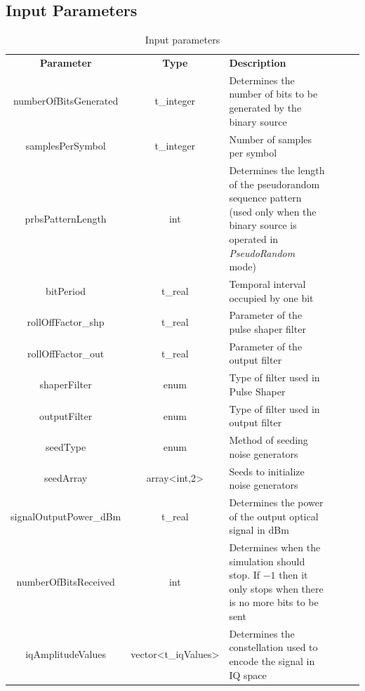 \subsection*{Input Parameters}


\begin{table}[H]
	\centering
	\caption{Input parameters}
	\begin{tabular}{|c|c|p{70mm}|ccp{70mm}}
		\cline{1-3}
		\textbf{Parameter} & \textbf{Type} & \textbf{Description} &    \\ \cline{1-3}
		numberOfBitsGenerated & t\_integer & Determines the number of bits to be generated by the binary source  &    \\ \cline{1-3}
		samplesPerSymbol & t\_integer & Number of samples per symbol &    \\ \cline{1-3}
		prbsPatternLength & int & Determines the length of the pseudorandom sequence pattern (used only when the binary source is operated in \textit{PseudoRandom} mode) &    \\ \cline{1-3}
		bitPeriod & t\_real & Temporal interval occupied by one bit &    \\ \cline{1-3}
		rollOffFactor\_shp & t\_real & Parameter of the pulse shaper filter &    \\ \cline{1-3}
		rollOffFactor\_out & t\_real & Parameter of the output filter &    \\ \cline{1-3}
		shaperFilter & enum & Type of filter used in Pulse Shaper &    \\ \cline{1-3}
		outputFilter & enum & Type of filter used in output filter &    \\ \cline{1-3}
		seedType & enum & Method of seeding noise generators &    \\ \cline{1-3}
		seedArray & array<int,2> & Seeds to initialize noise generators &    \\ \cline{1-3}
		signalOutputPower\_dBm & t\_real & Determines the power of the output optical signal in dBm &  \\ \cline{1-3}
		numberOfBitsReceived & int &   Determines when the simulation should stop. If $-1$ then it only stops when there is no more bits to be sent&   \\ \cline{1-3}
		iqAmplitudeValues & vector<t\_iqValues> & Determines the constellation used to encode the signal in IQ space &    \\ \cline{1-3}

\end{tabular}
\end{table}
